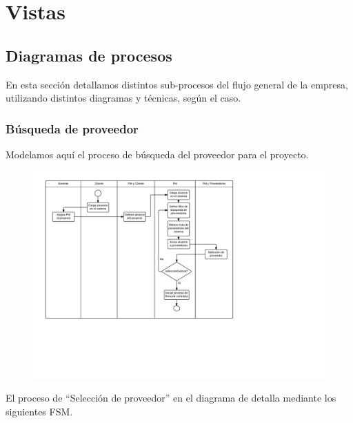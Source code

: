 \section{Vistas}




	\subsection{Diagramas de procesos}

En esta sección detallamos distintos sub-procesos del flujo general de la empresa, 
utilizando distintos diagramas y técnicas, según el caso. 

		\subsubsection{Búsqueda de proveedor}
Modelamos aquí el proceso de búsqueda del proveedor para el proyecto. 
\begin{figure}[H]
\includegraphics[width=\linewidth]{diag/nuevos/act-busqprov.png}
\end{figure}

El proceso de ``Selección de proveedor'' en el diagrama de detalla mediante 
los siguientes FSM. 

